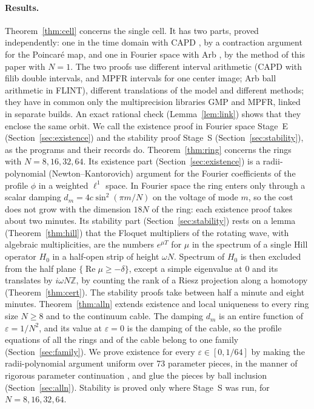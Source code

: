 \documentclass[11pt]{article}
\theoremstyle{definition}
\newcommand{\Z}{\mathbb{Z}}
\newcommand{\re}{\operatorname{Re}}
\begin{document}
\paragraph{Results.} Theorem~\ref{thm:cell} concerns the single cell. It has two parts, proved independently: one in the time domain with CAPD \cite{capd2021}, by a contraction argument for the Poincar\'e map, and one in Fourier space with Arb \cite{johansson2017}, by the method of this paper with $N = 1$. The two proofs use different interval arithmetic (CAPD with filib double intervals, and MPFR intervals for one center image; Arb ball arithmetic in FLINT), different translations of the model and different methods; they have in common only the multiprecision libraries GMP and MPFR, linked in separate builds. An exact rational check (Lemma~\ref{lem:link}) shows that they enclose the same orbit. We call the existence proof in Fourier space Stage~E (Section~\ref{sec:existence}) and the stability proof Stage~S (Section~\ref{sec:stability}), as the programs and their records do. Theorem~\ref{thm:ring} concerns the rings with $N = 8, 16, 32, 64$. Its existence part (Section~\ref{sec:existence}) is a radii-polynomial (Newton--Kantorovich) argument for the Fourier coefficients of the profile $\phi$ in a weighted $\ell^1$ space. In Fourier space the ring enters only through a scalar damping $d_m = 4c\sin^2(\pi m/N)$ on the voltage of mode $m$, so the cost does not grow with the dimension $18N$ of the ring: each existence proof takes about two minutes. Its stability part (Section~\ref{sec:stability}) rests on a lemma (Theorem~\ref{thm:hill}) that the Floquet multipliers of the rotating wave, with algebraic multiplicities, are the numbers $e^{\mu T}$ for $\mu$ in the spectrum of a single Hill operator $H_0$ in a half-open strip of height $\omega N$. Spectrum of $H_0$ is then excluded from the half plane $\{\re \mu \ge -\delta\}$, except a simple eigenvalue at $0$ and its translates by $i\omega N\Z$, by counting the rank of a Riesz projection along a homotopy (Theorem~\ref{thm:cert}). The stability proofs take between half a minute and eight minutes. Theorem~\ref{thm:alln} extends existence and local uniqueness to every ring size $N \ge 8$ and to the continuum cable. The damping $d_m$ is an entire function of $\varepsilon = 1/N^2$, and its value at $\varepsilon = 0$ is the damping of the cable, so the profile equations of all the rings and of the cable belong to one family (Section~\ref{sec:family}). We prove existence for every $\varepsilon \in [0, 1/64]$ by making the radii-polynomial argument uniform over 73 parameter pieces, in the manner of rigorous parameter continuation \cite{vblm2010}, and glue the pieces by ball inclusion (Section~\ref{sec:alln}). Stability is proved only where Stage~S was run, for $N = 8, 16, 32, 64$.
\end{document}
